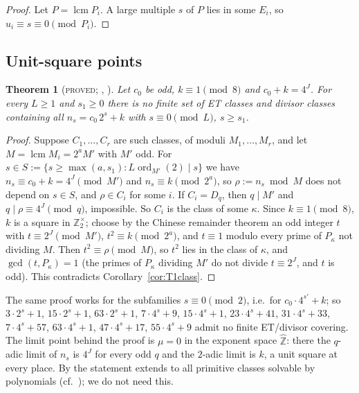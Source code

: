 \documentclass[11pt,reqno]{amsart}
\newtheorem{theorem}{Theorem}[section]
\theoremstyle{definition}
\newcommand{\Z}{\mathbb Z}
\newcommand{\Zh}{\widehat{\Z}}
\newcommand{\ord}{\operatorname{ord}}
\newcommand{\status}[1]{\textup{\textsc{#1}}}
\begin{document}
\begin{proof}
Let $P=\operatorname{lcm}P_i$.  A large multiple $s$ of $P$ lies in some
$E_i$, so $u_i\equiv s\equiv0\pmod{P_i}$.
\end{proof}

\subsection{Unit-square points}
\begin{theorem}[\status{proved}; {\cite[Thm.~1.4, Cor.~1.5]{ExpCov}, \cite[Lemma~3.1]{ExpNearSq}}]\label{thm:sterile}
Let $c_0$ be odd, $k\equiv1\pmod 8$ and $c_0+k=4^J$.  For every $L\ge1$ and
$s_1\ge0$ there is no finite set of ET classes and divisor classes
containing all $n_s=c_0\,2^s+k$ with $s\equiv0\pmod L$, $s\ge s_1$.
\end{theorem}

\begin{proof}
Suppose $C_1,\dots,C_r$ are such classes, of moduli $M_1,\dots,M_r$, and
let $M=\operatorname{lcm}M_i=2^aM'$ with $M'$ odd.  For
$s\in S:=\{s\ge\max(a,s_1): L\ord_{M'}(2)\mid s\}$ we have $n_s\equiv
c_0+k=4^J\pmod{M'}$ and $n_s\equiv k\pmod{2^a}$, so $\rho:=n_s\bmod M$ does
not depend on $s\in S$, and $\rho\in C_i$ for some $i$.  If $C_i=D_q$, then
$q\mid M'$ and $q\mid\rho\equiv4^J\pmod q$, impossible.  So $C_i$ is the
class of some $\kappa$.  Since $k\equiv1\pmod8$, $k$ is a square in
$\Z_2^\times$; choose by the Chinese remainder theorem an odd integer $t$
with $t\equiv2^J\pmod{M'}$, $t^2\equiv k\pmod{2^a}$, and $t\equiv1$ modulo
every prime of $P_\kappa$ not dividing $M$.  Then $t^2\equiv\rho\pmod M$, so
$t^2$ lies in the class of $\kappa$, and $\gcd(t,P_\kappa)=1$ (the primes of
$P_\kappa$ dividing $M'$ do not divide $t\equiv2^J$, and $t$ is odd).  This
contradicts Corollary~\ref{cor:T1class}.
\end{proof}

The same proof works for the subfamilies $s\equiv0\pmod 2$, i.e.\ for
$c_0\cdot4^{s'}+k$; so $3\cdot2^s+1$, $15\cdot2^s+1$, $63\cdot2^s+1$,
$7\cdot4^s+9$, $15\cdot4^s+1$, $23\cdot4^s+41$, $31\cdot4^s+33$,
$7\cdot4^s+57$, $63\cdot4^s+1$, $47\cdot4^s+17$, $55\cdot4^s+9$ admit no finite
ET/divisor covering.  The limit point behind the proof is $\mu=0$ in the
exponent space $\Zh$: there the $q$-adic limit of $n_s$ is $4^J$ for every
odd $q$ and the $2$-adic limit is $k$, a unit square at every place.  By
\cite[Prop.~1.9]{ET} the statement extends to all primitive classes solvable
by polynomials (cf.\ \cite[Prop.~3.1]{CovNote}); we do not need this.
\end{document}
